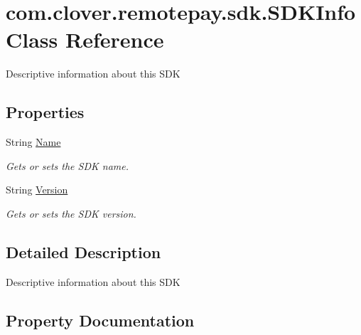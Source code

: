 \hypertarget{classcom_1_1clover_1_1remotepay_1_1sdk_1_1_s_d_k_info}{}\section{com.\+clover.\+remotepay.\+sdk.\+S\+D\+K\+Info Class Reference}
\label{classcom_1_1clover_1_1remotepay_1_1sdk_1_1_s_d_k_info}


Descriptive information about this S\+DK  


\subsection*{Properties}
\begin{DoxyCompactItemize}
\item 
String \hyperlink{classcom_1_1clover_1_1remotepay_1_1sdk_1_1_s_d_k_info_ae3c93c8379ce095c0371ced07d92d715}{Name}
\begin{DoxyCompactList}\small\item\em Gets or sets the S\+DK name. \end{DoxyCompactList}\item 
String \hyperlink{classcom_1_1clover_1_1remotepay_1_1sdk_1_1_s_d_k_info_a48f760a4186c72115f1e00bc4446ce09}{Version}
\begin{DoxyCompactList}\small\item\em Gets or sets the S\+DK version. \end{DoxyCompactList}\end{DoxyCompactItemize}


\subsection{Detailed Description}
Descriptive information about this S\+DK 



\subsection{Property Documentation}
\mbox{\label{classcom_1_1clover_1_1remotepay_1_1sdk_1_1_s_d_k_info_ae3c93c8379ce095c0371ced07d92d715}} 
